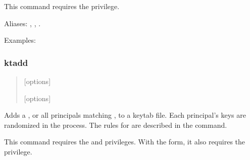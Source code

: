 \documentclass[letterpaper,10pt,english]{sphinxmanual}
\begin{document}
\sphinxAtStartPar
This command requires the  privilege.

\sphinxAtStartPar
Aliases: , , .

\sphinxAtStartPar
Examples:

\begin{sphinxVerbatim}[commandchars=\\\{\}]
  

   
\end{sphinxVerbatim}


\subsubsection{ktadd}
\label{\detokenize{admin/admin_commands/kadmin_local:ktadd}}\label{\detokenize{admin/admin_commands/kadmin_local:id18}}\begin{quote}

\begin{DUlineblock}{0em}
\item[]  {[}options{]} 
\item[]  {[}options{]}  
\end{DUlineblock}
\end{quote}

\sphinxAtStartPar
Adds a , or all principals matching , to a
keytab file.  Each principal’s keys are randomized in the process.
The rules for  are described in the 
command.

\sphinxAtStartPar
This command requires the  and  privileges.
With the  form, it also requires the  privilege.
\end{document}
